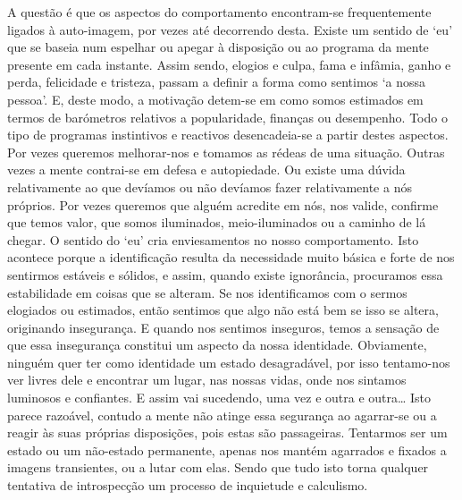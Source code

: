 A questão é que os aspectos do comportamento encontram-se frequentemente ligados à auto-imagem, por vezes até decorrendo desta. Existe um sentido de `eu' que se baseia num espelhar ou apegar à disposição ou ao programa da mente presente em cada instante. Assim sendo, elogios e culpa, fama e infâmia, ganho e perda, felicidade e tristeza, passam a definir a forma como sentimos `a nossa pessoa'. E, deste modo, a motivação detem-se em como somos estimados em termos de barómetros relativos a popularidade, finanças ou desempenho. Todo o tipo de programas instintivos e reactivos desencadeia-se a partir destes aspectos. Por vezes queremos melhorar-nos e tomamos as rédeas de uma situação. Outras vezes a mente contrai-se em defesa e autopiedade. Ou existe uma dúvida relativamente ao que devíamos ou não devíamos fazer relativamente a nós próprios. Por vezes queremos que alguém acredite em nós, nos valide, confirme que temos valor, que somos iluminados, meio-iluminados ou a caminho de lá chegar. O sentido do `eu' cria enviesamentos no nosso comportamento. Isto acontece porque a identificação resulta da necessidade muito básica e forte de nos sentirmos estáveis e sólidos, e assim, quando existe ignorância, procuramos essa estabilidade em coisas que se alteram. Se nos identificamos com o sermos elogiados ou estimados, então sentimos que algo não está bem se isso se altera, originando insegurança. E quando nos sentimos inseguros, temos a sensação de que essa insegurança constitui um aspecto da nossa identidade. Obviamente, ninguém quer ter como identidade um estado desagradável, por isso tentamo-nos ver livres dele e encontrar um lugar, nas nossas vidas, onde nos sintamos luminosos e confiantes. E assim vai sucedendo, uma vez e outra e outra\ldots{} Isto parece razoável, contudo a mente não atinge essa segurança ao agarrar-se ou a reagir às suas próprias disposições, pois estas são passageiras. Tentarmos ser um estado ou um não-estado permanente, apenas nos mantém agarrados e fixados a imagens transientes, ou a lutar com elas. Sendo que tudo isto torna qualquer tentativa de introspecção um processo de inquietude e calculismo.

